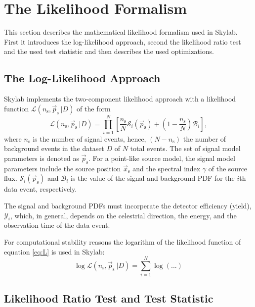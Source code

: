 \documentclass{article}
\newcommand{\ns}{n_{\mathrm{s}}}
\newcommand{\ps}{\vec{p}_{\mathrm{s}}}
\newcommand{\xs}{\vec{x}_{\mathrm{s}}}
\begin{document}
\section{The Likelihood Formalism}

This section describes the mathematical likelihood formalism used in Skylab.
First it introduces the log-likelihood approach, second the likelihood ratio
test and the used test statistic and then describes the used optimizations.

\subsection{The Log-Likelihood Approach}

Skylab implements the two-component likelihood approach with a likelihood
function $\mathcal{L}(n_{\mathrm{s}},\vec{p}_{\mathrm{s}}~|D)$ of the form
\begin{equation}
 \mathcal{L}(\ns,\ps~|D) = \prod_{i=1}^{N}\left[ \frac{\ns}{N} \mathcal{S}_{i}(\ps) + (1 - \frac{\ns}{N}) \mathcal{B}_{i} \right],
\label{eq:L}
\end{equation}
where $\ns$ is the number of signal events, hence, $(N-\ns)$ the number of
background events in the dataset $D$ of $N$ total events.
The set of signal model parameters is denoted as $\ps$. For a point-like source
model, the signal model parameters include the source position $\xs$ and the
spectral index $\gamma$ of the source flux.
$\mathcal{S}_i(\ps)$ and $\mathcal{B}_i$ is the value of the signal and background PDF for the $i$th data
event, respectively.

The signal and background PDFs must incorperate the detector efficiency (yield),
$\mathcal{Y}_i$, which, in general, depends on the celestrial direction, the
energy, and the observation time of the data event.

For computational stability reasons the logarithm of the likelihood function of
equation \ref{eq:L} is used in Skylab:
\begin{equation}
 \log \mathcal{L}(\ns,\ps~|D) = \sum_{i=1}^{N} \log (...)
\end{equation}

\subsection{Likelihood Ratio Test and Test Statistic}
\end{document}
